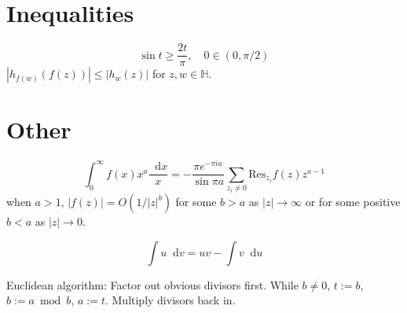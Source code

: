 \documentclass[10pt]{article}
\newcommand\dif{\mathop{}\!\mathrm{d}}
\newcommand{\Res}{\mathrm{Res}}
\begin{document}
\section{Inequalities}
$$
\sin t \geq \frac{2t}{\pi}, \quad 0 \in (0, \pi / 2)
$$
$|h_{f(w)}(f(z))| \leq |h_w(z)|$ for $z, w \in \mathbb{H}$.

\section{Other}
$$
  \int_0^\infty f(x) x^a \frac{\dif x}{x}
= -\frac{\pi e^{-\pi i a}}{\sin \pi a}
  \sum_{z_i \neq 0} \Res_{z_i} f(z) z^{a-1}
$$
when $a > 1$, $|f(z)| = O(1 / |z|^b)$ for some $b > a$ as $|z| \to \infty$
or for some positive $b < a$ as $|z| \to 0$.

$$
\int u \dif v = uv - \int v \dif u
$$

Euclidean algorithm: Factor out obvious divisors first.
While $b \neq 0$, $t := b$, $b := a \bmod b$, $a := t$.
Multiply divisors back in.
\end{document}
